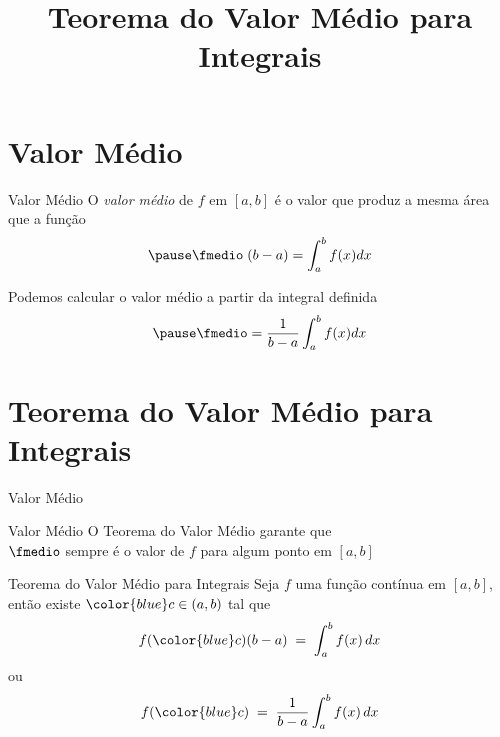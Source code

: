 \documentclass[fleqn,utf8,aspectratio=169,12pt]{beamer}
\title{Teorema do Valor Médio para Integrais}
\begin{document}
\addtitle

\section{Valor Médio}

\begin{frame}{Valor Médio}
  O \emph{valor médio} de $f$ em $[a, b]$ é
  \pause
  o valor que produz a mesma área que a função
  \[
    \pause
    \fmedio\;(b-a) = \int_a^b f(x) dx
  \]

  \pause
  Podemos calcular o valor médio a partir da integral definida
  \[
    \pause
    \fmedio = \frac{1}{b-a} \int_a^b f(x) dx
  \]
\end{frame}

\section{Teorema do Valor Médio para Integrais}

\begin{frame}{Valor Médio}
  \centering
  \bigskip
  
\end{frame}

\begin{frame}{Valor Médio}
  O Teorema do Valor Médio garante que\\[1mm]
  \pause
  \medskip
  \(\fmedio\) sempre é o valor de $f$ para algum ponto em $[a, b]$
\end{frame}

\begin{frame}{Teorema do Valor Médio para Integrais}
  Seja $f$ uma função {\color{blue} contínua} em $[a, b]$, \pause
  então existe ${\color{blue} c} \in (a, b)$ \pause
  tal que
  \[
    f({\color{blue}c})(b-a)
    \;=\; \int_a^b f(x)\,dx
  \]
  \pause
  ou
  \[
    f({\color{blue}c})
    \;=\; \frac{1}{b-a}\int_a^b f(x)\,dx
  \]
\end{frame}

\end{document}
